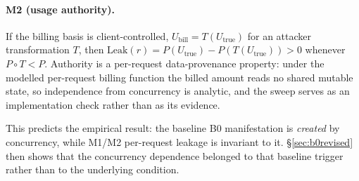 \paragraph{M2 (usage authority).} If the billing basis is client-controlled,
$U_{\text{bill}}=T(U_{\text{true}})$ for an attacker transformation $T$, then
$\mathrm{Leak}(r)=P(U_{\text{true}})-P(T(U_{\text{true}}))>0$ whenever $P\circ T<P$.
Authority is a per-request data-provenance property: under the modelled per-request
billing function the billed amount reads no shared mutable state, so independence from
concurrency is analytic, and the sweep serves as an implementation check rather than as
its evidence.

\begin{table}[t]\centering
\caption{Structural distinction between the three mechanisms. ``Baseline trigger'' is
what exercises the defect in the implementation we measured; it is not the security
condition. For B0 in particular, overlapping requests are one trigger and deferred
settlement is another (\S\ref{sec:b0revised}), so the condition is stated in terms of
authorization/commitment coupling rather than concurrency.}
\label{tab:structural}
\end{table}

This predicts the empirical result: the baseline B0 manifestation is \emph{created} by
concurrency, while M1/M2 per-request leakage is invariant to it. \S\ref{sec:b0revised}
then shows that the concurrency dependence belonged to that baseline trigger rather than
to the underlying condition.
